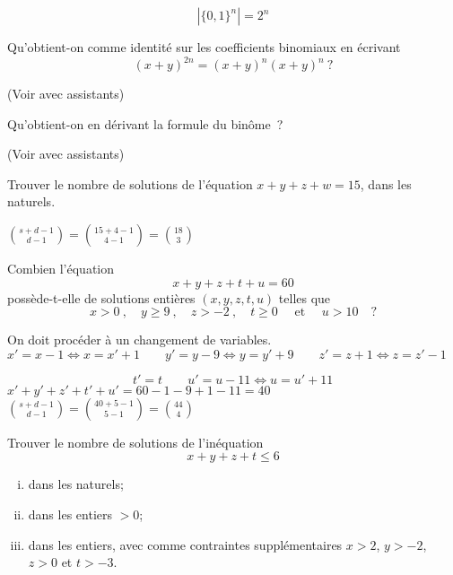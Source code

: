 $$ |\{ 0,1 \}^n| = 2^n $$


\begin{exo}
Qu'obtient-on comme identit\'e sur les coefficients binomiaux en \'ecrivant
$$
(x+y)^{2n} = (x+y)^n(x+y)^n\ ?
$$
\end{exo}

(Voir avec assistants)


\begin{exo}
Qu'obtient-on en d\'erivant la formule du bin\^ome~?
\end{exo}

(Voir avec assistants)


\begin{exo}
Trouver le nombre de solutions de l'\'equation $x + y + z + w = 15$, dans les naturels.
\end{exo}

$ { s + d - 1 \choose d - 1 } = { 15 + 4 - 1 \choose 4 - 1} = {18 \choose 3 }$


\begin{exo} 
Combien l'\'equation
$$
x + y + z + t + u = 60
$$
poss\`ede-t-elle de solutions enti\`eres $(x,y,z,t,u)$ telles que
$$
x > 0\ ,\quad y \geqslant 9\ , \quad z > -2\ , \quad t \geqslant 0 \quad \textrm{ et }  \quad u > 10 \quad ?
$$
\end{exo}

On doit procéder à un changement de variables.\\

${x}' = x-1 \Leftrightarrow x= {x}'+1 \qquad {y}' = y-9 \Leftrightarrow y= {y}'+9 \qquad {z}' = z+1 \Leftrightarrow z= {z}'-1 $

$\qquad \qquad \qquad \qquad \qquad {t}' = t \qquad {u}' = u-11 \Leftrightarrow u= {u}'+11$\\

${x}'+{y}'+{z}'+{t}'+{u}' = 60 - 1 - 9 + 1 - 11 = 40$\\

${s + d - 1 \choose d - 1} = {40 + 5 - 1 \choose 5 - 1} = {44 \choose 4}$

\begin{exo} 
Trouver le nombre de solutions de l'in\'equation
$$
x + y + z + t \leqslant 6
$$
%
\begin{enumerate}[(i)]
\item dans les naturels;
\item dans les entiers $>0$;
\item dans les entiers, avec comme contraintes suppl\'ementaires $x > 2$, $y > -2$, $z > 0$ et $t > -3$.
\end{enumerate}
\end{exo}

